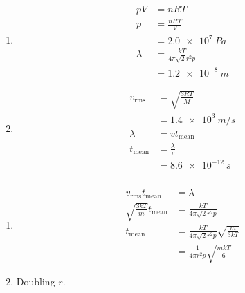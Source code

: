 \documentclass{article}
\begin{document}
\subsubsection{}

\begin{enumerate}
  \item

        \begin{align*}
          p V     & = n R T                            \\
          p       & = \frac{n R T}{V}                  \\
                  & = \qty{2.0e7}{Pa}                  \\
          \lambda & = \frac{k T}{4 \pi \sqrt{2} r^2 p} \\
                  & = \qty{1.2e-8}{m}
        \end{align*}

  \item

        \begin{align*}
          v_\text{rms}  & = \sqrt{\frac{3 R T}{M}} \\
                        & = \qty{1.4e3}{m/s}       \\
          \lambda       & = v t_\text{mean}        \\
          t_\text{mean} & = \frac{\lambda}{v}      \\
                        & = \qty{8.6e-12}{s}
        \end{align*}
\end{enumerate}

\subsubsection{}

\begin{enumerate}
  \item

        \begin{align*}
          v_\text{rms} t_\text{mean}           & = \lambda                                                 \\
          \sqrt{\frac{3 k T}{m}} t_\text{mean} & = \frac{k T}{4 \pi \sqrt{2} r^2 p}                        \\
          t_\text{mean}                        & = \frac{k T}{4 \pi \sqrt{2} r^2 p} \sqrt{\frac{m}{3 k T}} \\
                                               & = \frac{1}{4 \pi r^2 p} \sqrt{\frac{m k T}{6}}
        \end{align*}

  \item Doubling $r$.
\end{enumerate}
\end{document}
